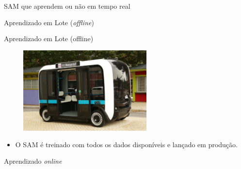 \documentclass[12pt,mathserif,aspectratio=169]{beamer}
\begin{document}
\begin{frame}
	\Huge SAM que aprendem ou não em tempo real
\end{frame}

\begin{frame}
	\Huge Aprendizado em Lote ({\it offline})
\end{frame}

\begin{frame}{Aprendizado em Lote (offline)}
    \begin{figure}
		\includegraphics[width=0.6\textwidth]{fig/olli.jpg}
	\end{figure}
	
	\begin{itemize}
        \item O SAM é treinado com todos os dados disponíveis e lançado em produção.
    \end{itemize}
\end{frame}

\begin{frame}
	\Huge Aprendizado {\it online}
\end{frame}
\end{document}
